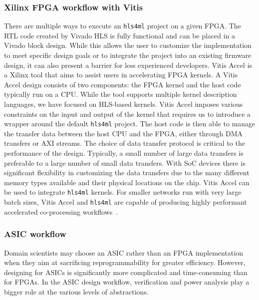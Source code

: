 \documentclass[sigconf]{acmart}
\newcommand{\hlsfml}{\texttt{hls4ml}\xspace}
\begin{document}
\subsubsection{Xilinx FPGA workflow with Vitis}
There are multiple ways to execute an \hlsfml project on a given FPGA.
The RTL code created by Vivado HLS is fully functional and can be placed in a Vivado block design.
While this allows the user to customize the implementation to meet specific design goals or to integrate the project into an existing firmware design, it can also present a barrier for less experienced developers.
Vitis Accel is a Xilinx tool that aims to assist users in accelerating FPGA kernels.
A Vitis Accel design consists of two components: the FPGA kernel and the host code typically run on a CPU.
While the tool supports multiple kernel description languages, we have focused on HLS-based kernels.
Vitis Accel imposes various constraints on the input and output of the kernel that requires us to introduce a wrapper around the default \hlsfml project.
The host code is then able to manage the transfer data between the host CPU and the FPGA, either through DMA transfers or AXI streams.
The choice of data transfer protocol is critical to the performance of the design.
Typically, a small number of large data transfers is preferable to a large number of small data transfers.
With SoC devices there is significant flexibility in customizing the data transfers due to the many different memory types available and their physical locations on the chip.
Vitis Accel can be used to integrate \hlsfml kernels.
For smaller networks run with very large batch sizes, Vitis Accel and \hlsfml are capable of producing highly performant accelerated co-processing workflows~\cite{rankin2020fpgasasaservice}.

\subsubsection{ASIC workflow}
Domain scientists may choose an ASIC rather than an FPGA implementation when they aim at sacrificing reprogrammability for greater efficiency. 
However, designing for ASICs is significantly more complicated and time-consuming than for FPGAs. 
In the ASIC design workflow, verification and power analysis play a bigger role at the various levels of abstractions.
\end{document}

